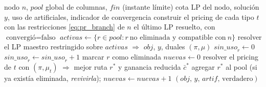\documentclass[12pt]{article}
\numberwithin{algorithm}{section}
\begin{document}
\begin{algorithm}[H]
\caption{\textsc{CGenNodo} --- generación de columnas en un nodo, con eliminación de columnas}
\label{alg:cgnodo}
\begin{algorithmic}[1]
\Require nodo $n$, $\mathit{pool}$ global de columnas, $\mathit{fin}$ (instante límite)
\Ensure cota LP del nodo, solución $y$, uso de artificiales, indicador de convergencia
\State construir el pricing de cada tipo $t$ con las restricciones \eqref{eq:pr_branch} de $n$ 
\Loop
     \Return el último LP resuelto, con $\text{convergió} = \text{falso}$
    \EndIf
    \State $\mathit{activas} \gets \{r \in \mathit{pool} : r\ \text{no eliminada y compatible con}\ n\}$
    \State resolver el LP maestro restringido sobre $\mathit{activas}$ $\Rightarrow$ $\mathit{obj}$, $y$, duales $(\pi, \mu)$
     
         $\mathit{sin\_uso}_r \gets 0$
        \Else{} $\mathit{sin\_uso}_r \gets \mathit{sin\_uso}_r + 1$
        \EndIf
         marcar $r$ como eliminada
        \EndIf
    \EndFor
    \State $\mathit{nuevas} \gets 0$
        \State resolver el pricing de $t$ con $(\pi, \mu_t)$ $\Rightarrow$ mejor ruta $r^*$ y ganancia reducida $\bar{c}^*$
         agregar $r^*$ al pool (si ya existía eliminada, \emph{revivirla}); $\mathit{nuevas} \gets \mathit{nuevas} + 1$
        \EndIf
    \EndFor
     \Return $(\mathit{obj},\, y,\, \mathit{artif},\, \text{verdadero})$ 
    \EndIf
\EndLoop
\end{algorithmic}
\end{algorithm}
\end{document}
